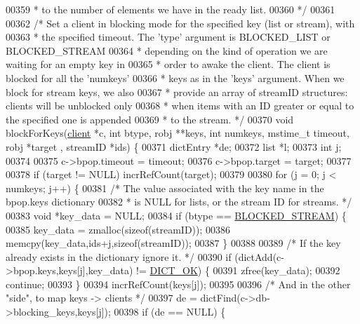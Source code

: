 \begin{DoxyCode}
00359 \textcolor{comment}{ *   to the number of elements we have in the ready list.}
00360 \textcolor{comment}{ */}
00361 
00362 \textcolor{comment}{/* Set a client in blocking mode for the specified key (list or stream), with}
00363 \textcolor{comment}{ * the specified timeout. The 'type' argument is BLOCKED\_LIST or BLOCKED\_STREAM}
00364 \textcolor{comment}{ * depending on the kind of operation we are waiting for an empty key in}
00365 \textcolor{comment}{ * order to awake the client. The client is blocked for all the 'numkeys'}
00366 \textcolor{comment}{ * keys as in the 'keys' argument. When we block for stream keys, we also}
00367 \textcolor{comment}{ * provide an array of streamID structures: clients will be unblocked only}
00368 \textcolor{comment}{ * when items with an ID greater or equal to the specified one is appended}
00369 \textcolor{comment}{ * to the stream. */}
00370 \textcolor{keywordtype}{void} blockForKeys(\hyperlink{structclient}{client} *c, \textcolor{keywordtype}{int} btype, robj **keys, \textcolor{keywordtype}{int} numkeys, mstime\_t timeout, robj *target
      , streamID *ids) \{
00371     dictEntry *de;
00372     list *l;
00373     \textcolor{keywordtype}{int} j;
00374 
00375     c->bpop.timeout = timeout;
00376     c->bpop.target = target;
00377 
00378     \textcolor{keywordflow}{if} (target != NULL) incrRefCount(target);
00379 
00380     \textcolor{keywordflow}{for} (j = 0; j < numkeys; j++) \{
00381         \textcolor{comment}{/* The value associated with the key name in the bpop.keys dictionary}
00382 \textcolor{comment}{         * is NULL for lists, or the stream ID for streams. */}
00383         \textcolor{keywordtype}{void} *key\_data = NULL;
00384         \textcolor{keywordflow}{if} (btype == \hyperlink{server_8h_a1f48bb63f9d0c061421044b92b46f679}{BLOCKED\_STREAM}) \{
00385             key\_data = zmalloc(\textcolor{keyword}{sizeof}(streamID));
00386             memcpy(key\_data,ids+j,\textcolor{keyword}{sizeof}(streamID));
00387         \}
00388 
00389         \textcolor{comment}{/* If the key already exists in the dictionary ignore it. */}
00390         \textcolor{keywordflow}{if} (dictAdd(c->bpop.keys,keys[j],key\_data) != \hyperlink{dict_8h_a2afecbeab8f7efbc183048f52f6d17e5}{DICT\_OK}) \{
00391             zfree(key\_data);
00392             \textcolor{keywordflow}{continue};
00393         \}
00394         incrRefCount(keys[j]);
00395 
00396         \textcolor{comment}{/* And in the other "side", to map keys -> clients */}
00397         de = dictFind(c->db->blocking\_keys,keys[j]);
00398         \textcolor{keywordflow}{if} (de == NULL) \{

\end{DoxyCode}
